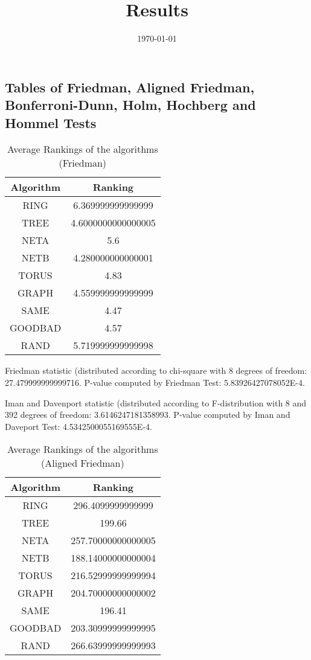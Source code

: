 \documentclass[a4paper,10pt]{article}
\title{Results}
\author{}
\date{\today}
\begin{document}
\begin{landscape}
\oddsidemargin 0in \topmargin 0in\maketitle
\section{Tables of Friedman, Aligned Friedman, Bonferroni-Dunn, Holm, Hochberg and Hommel Tests}
\begin{table}[!htp]
\centering
\caption{Average Rankings of the algorithms (Friedman)
}\begin{tabular}{c|c}
Algorithm&Ranking\\
\hline
 RING&6.369999999999999\\
 TREE&4.6000000000000005\\
 NETA&5.6\\
 NETB&4.280000000000001\\
 TORUS&4.83\\
 GRAPH&4.559999999999999\\
 SAME&4.47\\
 GOODBAD&4.57\\
 RAND&5.719999999999998\\
\end{tabular}
\end{table}


Friedman statistic (distributed according to chi-square with 8 degrees of freedom: 27.479999999999716. 
P-value computed by Friedman Test: 5.83926427078052E-4.\newline

Iman and Davenport statistic (distributed according to F-distribution with 8 and 392 degrees of freedom: 3.6146247181358993. 
P-value computed by Iman and Daveport Test: 4.5342500055169555E-4.\newline


\newpage

\begin{table}[!htp]
\centering
\caption{Average Rankings of the algorithms (Aligned Friedman)
}\begin{tabular}{c|c}
Algorithm&Ranking\\
\hline
 RING&296.4099999999999\\
 TREE&199.66\\
 NETA&257.70000000000005\\
 NETB&188.14000000000004\\
 TORUS&216.52999999999994\\
 GRAPH&204.70000000000002\\
 SAME&196.41\\
 GOODBAD&203.30999999999995\\
 RAND&266.63999999999993\\
\end{tabular}
\end{table}



\end{landscape}
\end{document}
